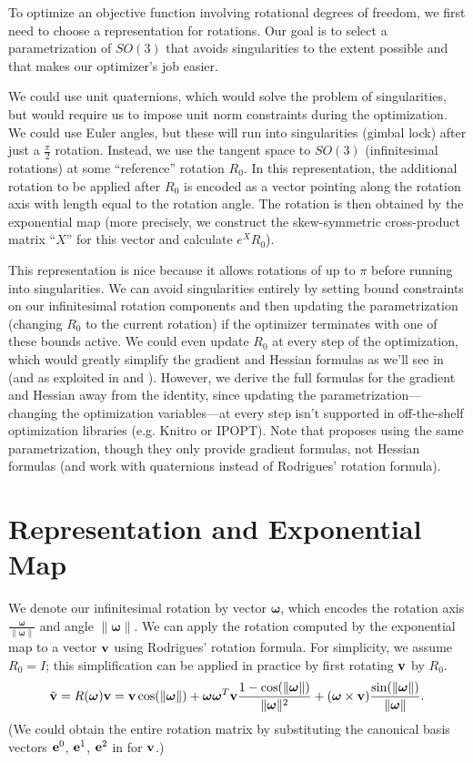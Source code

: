 \documentclass[10pt]{article}
\title{\documenttitle}
\author{Julian Panetta}
\providecommand{\norm}[1]{\lVert#1\rVert}
\providecommand{\cross}{\times}
\renewcommand{\vec}[1]{{\bf #1}}
\newcommand\pr[1]{\prettyref{#1}}
\def\w{\boldsymbol{\omega}}
\def\wn{\norm{\w}}
\def\v{\vec{v}}
\def\e{\vec{e}}
\begin{document}
\maketitle

To optimize an objective function involving rotational
degrees of freedom, we first need to choose a representation for rotations.
Our goal is to select a parametrization of $SO(3)$ that avoids
singularities to the extent possible and that makes our optimizer's job easier.

We could use unit quaternions, which would solve the problem
of singularities, but would require us to impose unit norm constraints during the optimization. We could
use Euler angles, but these will run into singularities (gimbal lock) after just
a $\frac{\pi}{2}$ rotation. Instead, we use the tangent space to $SO(3)$
(infinitesimal rotations) at some ``reference'' rotation $R_0$. In this representation, the additional
rotation to be applied after  $R_0$ is encoded as a vector pointing along the
rotation axis with length equal to the rotation angle. The rotation is then
obtained by the exponential map (more precisely, we construct the skew-symmetric cross-product matrix ``$X$'' for this
vector and calculate $e^X R_0$).

This representation is nice because it allows rotations of up to $\pi$ before
running into singularities. We can avoid singularities entirely by setting bound
constraints on our infinitesimal rotation components and then updating the
parametrization (changing $R_0$ to the current rotation) if the optimizer
terminates with one of these bounds active. We could even update $R_0$
at every step of the optimization, which would greatly
simplify the gradient and Hessian formulas as we'll see in \pr{sec:around_identity}
(and as exploited
in \cite{kugelstadt2018fast} and \cite{taylor1994minimization}). However, we
derive the full formulas for the gradient and Hessian away from the identity, since
updating the parametrization---changing the optimization variables---at every
step isn't supported in off-the-shelf optimization libraries (e.g. Knitro or
IPOPT). Note that \cite{grassia1998practical} proposes using the same
parametrization, though they only provide gradient formulas, not Hessian
formulas (and work with quaternions instead of Rodrigues' rotation formula).

\section{Representation and Exponential Map}
\label{sec:representation}
We denote our infinitesimal rotation by vector $\w$, which encodes the rotation axis $\frac{\w}{\norm{\w}}$
and angle $\norm{\w}$.
We can apply the rotation computed by the exponential map to a vector $\v$ using Rodrigues' rotation formula.
For simplicity, we assume $R_0 = I$; this simplification can be applied in practice by first rotating $\v$ by $R_0$.
$$
\tilde{\v} = R(\w) \v =
        \v \cos(\wn) + \w \w^T \v \frac{1 - \cos(\wn)}{\wn^2} + (\w \cross \v) \frac{\sin(\wn)}{\wn}.
$$
(We could obtain the entire rotation matrix by substituting the canonical basis vectors $\e^0$,  $\e^1$,  $\e^2$ in for $\v$.)
\end{document}
